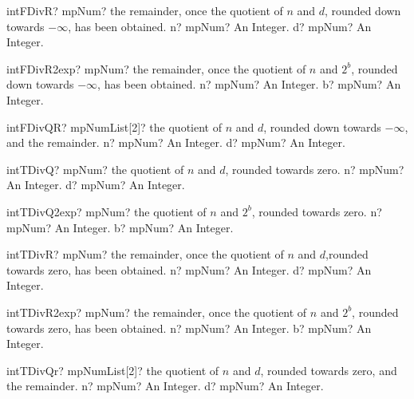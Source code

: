\documentclass[12pt,a4paper,openany]{book}
\begin{document}
\begin{mpFunctionsExtract}
\mpFunctionTwo
{intFDivR? mpNum? the remainder, once the quotient of $n$ and $d$, rounded down towards $-\infty$, has been obtained.}
{n? mpNum? An Integer.}
{d? mpNum? An Integer.}
\end{mpFunctionsExtract}

\begin{mpFunctionsExtract}
\mpFunctionTwo
{intFDivR2exp? mpNum? the remainder, once the quotient of $n$ and $2^b$, rounded down towards $-\infty$, has been obtained.}
{n? mpNum? An Integer.}
{b? mpNum? An Integer.}
\end{mpFunctionsExtract}

\begin{mpFunctionsExtract}
\mpFunctionTwo
{intFDivQR? mpNumList[2]? the quotient of $n$ and $d$, rounded down towards $-\infty$, and the remainder.}
{n? mpNum? An Integer.}
{d? mpNum? An Integer.}
\end{mpFunctionsExtract}

\begin{mpFunctionsExtract}
\mpFunctionTwo
{intTDivQ? mpNum? the quotient of $n$ and $d$, rounded towards zero.}
{n? mpNum? An Integer.}
{d? mpNum? An Integer.}
\end{mpFunctionsExtract}

\begin{mpFunctionsExtract}
\mpFunctionTwo
{intTDivQ2exp? mpNum? the quotient of $n$ and $2^b$, rounded towards zero.}
{n? mpNum? An Integer.}
{b? mpNum? An Integer.}
\end{mpFunctionsExtract}

\begin{mpFunctionsExtract}
\mpFunctionTwo
{intTDivR? mpNum? the remainder, once the quotient of $n$ and $d$,rounded towards zero, has been obtained.}
{n? mpNum? An Integer.}
{d? mpNum? An Integer.}
\end{mpFunctionsExtract}

\begin{mpFunctionsExtract}
\mpFunctionTwo
{intTDivR2exp? mpNum? the remainder, once the quotient of $n$ and $2^b$, rounded towards zero, has been obtained.}
{n? mpNum? An Integer.}
{b? mpNum? An Integer.}
\end{mpFunctionsExtract}

\begin{mpFunctionsExtract}
\mpFunctionTwo
{intTDivQr? mpNumList[2]? the quotient of $n$ and $d$, rounded towards zero, and the remainder.}
{n? mpNum? An Integer.}
{d? mpNum? An Integer.}
\end{mpFunctionsExtract}
\end{document}
